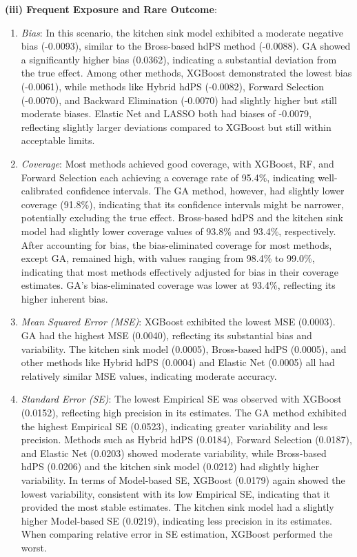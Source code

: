 \documentclass[sn-vancouver,Numbered,lineno,pdflatex]{sn-jnl}
\begin{document}
\textbf{(iii) Frequent Exposure and Rare Outcome}:

\begin{enumerate}
\def\labelenumi{\arabic{enumi}.}
\item
  \emph{Bias}: In this scenario, the kitchen sink model exhibited a
  moderate negative bias (-0.0093), similar to the Bross-based hdPS
  method (-0.0088). GA showed a significantly higher bias (0.0362),
  indicating a substantial deviation from the true effect. Among other
  methods, XGBoost demonstrated the lowest bias (-0.0061), while methods
  like Hybrid hdPS (-0.0082), Forward Selection (-0.0070), and Backward
  Elimination (-0.0070) had slightly higher but still moderate biases.
  Elastic Net and LASSO both had biases of -0.0079, reflecting slightly
  larger deviations compared to XGBoost but still within acceptable
  limits.
\item
  \emph{Coverage}: Most methods achieved good coverage, with XGBoost,
  RF, and Forward Selection each achieving a coverage rate of 95.4\%,
  indicating well-calibrated confidence intervals. The GA method,
  however, had slightly lower coverage (91.8\%), indicating that its
  confidence intervals might be narrower, potentially excluding the true
  effect. Bross-based hdPS and the kitchen sink model had slightly lower
  coverage values of 93.8\% and 93.4\%, respectively. After accounting
  for bias, the bias-eliminated coverage for most methods, except GA,
  remained high, with values ranging from 98.4\% to 99.0\%, indicating
  that most methods effectively adjusted for bias in their coverage
  estimates. GA's bias-eliminated coverage was lower at 93.4\%,
  reflecting its higher inherent bias.
\item
  \emph{Mean Squared Error (MSE)}: XGBoost exhibited the lowest MSE
  (0.0003). GA had the highest MSE (0.0040), reflecting its substantial
  bias and variability. The kitchen sink model (0.0005), Bross-based
  hdPS (0.0005), and other methods like Hybrid hdPS (0.0004) and Elastic
  Net (0.0005) all had relatively similar MSE values, indicating
  moderate accuracy.
\item
  \emph{Standard Error (SE)}: The lowest Empirical SE was observed with
  XGBoost (0.0152), reflecting high precision in its estimates. The GA
  method exhibited the highest Empirical SE (0.0523), indicating greater
  variability and less precision. Methods such as Hybrid hdPS (0.0184),
  Forward Selection (0.0187), and Elastic Net (0.0203) showed moderate
  variability, while Bross-based hdPS (0.0206) and the kitchen sink
  model (0.0212) had slightly higher variability. In terms of
  Model-based SE, XGBoost (0.0179) again showed the lowest variability,
  consistent with its low Empirical SE, indicating that it provided the
  most stable estimates. The kitchen sink model had a slightly higher
  Model-based SE (0.0219), indicating less precision in its estimates.
  When comparing relative error in SE estimation, XGBoost performed the
  worst.
\end{enumerate}
\end{document}
